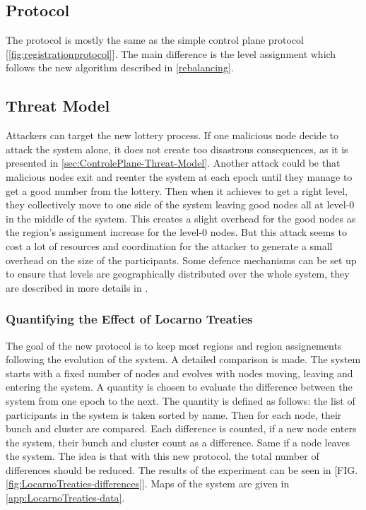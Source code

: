 \documentclass[a4paper,11pt,twoside,openright]{report}
\begin{document}
\subsection{Protocol}
The protocol is mostly the same as the simple control plane protocol
[\autoref{fig:registrationprotocol}]. The main difference is the level
assignment which follows the new algorithm described in \autoref{rebalancing}. 

\subsection{Threat Model}

Attackers can target the new lottery process. If one malicious node 
decide to attack the system alone, it does not create too disastrous consequences, as it is
presented in \autoref{sec:ControlePlane-Threat-Model}. Another attack could be
that malicious nodes exit and reenter the system at each epoch until they
manage to get a good number from the lottery. Then when it achieves to get a
right level, they collectively move to one side of the system leaving good nodes
all at level-0 in the middle of the system. This creates a slight overhead
for the good nodes as the region’s assignment increase for the level-0 nodes.
But this attack seems to cost a lot of resources and coordination for the
attacker to generate a small overhead on the size of the participants. Some
defence mechanisms can be set up to ensure that levels are geographically
distributed over the whole system, they are described in more details in
.

\subsubsection{Quantifying the Effect of Locarno Treaties}
The goal of the new protocol is to keep most regions and region assignements
following the evolution of the system. A detailed comparison is made. The
system starts with a fixed number of nodes and evolves with nodes moving,
leaving and entering the system. A quantity is chosen to evaluate the
difference between the system from one epoch to the next. The quantity is
defined as follows: the list of participants in the system is taken sorted by
name. Then for each node, their bunch and cluster are compared. Each
difference is counted, if a new node enters the system, their bunch and
cluster count as a difference. Same if a node leaves the system. The idea is
that with this new protocol, the total number of differences should be reduced.
The results of the experiment can be seen in [FIG.
\autoref{fig:LocarnoTreaties-differences}]. Maps of the system are given in
\autoref{app:LocarnoTreaties-data}.
\end{document}
